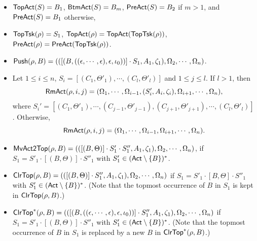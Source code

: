 \begin{itemize}
    \item $\mathsf{TopAct}(S) = B_1$, ${\sf BtmAct}(S) = B_m$, %
          $\mathsf{PreAct}(S) = B_2$ if $m> 1$, and $\mathsf{PreAct}(S) = B_1$ otherwise,
	\item $\mathsf{TopTsk}(\rho) = S_1$,  %
        $\mathsf{TopAct}(\rho) = \mathsf{TopAct}(\mathsf{TopTsk}(\rho))$, %
        $\mathsf{PreAct}(\rho) = \mathsf{PreAct}(\mathsf{TopTsk}(\rho))$.
	
    \item $\mathsf{Push}(\rho, B) = (([(B,((\epsilon,\cdots,\epsilon),\epsilon,\iota_0))] \cdot S_1,A_1,\zeta_1), \Omega_2, \cdots, \Omega_n)$.
%
	\item Let $1 \le i \le n$, $S_i = [(C_1, \Theta'_1), \cdots, (C_l, \Theta'_l)]$ and $1 \le j \le l$.  If $l>1$, then 
	$$\mathsf{RmAct}(\rho,i, j) = (\Omega_1,\cdots,\Omega_{i-1},(S_i', A_i, \zeta_i),\Omega_{i+1},\cdots,\Omega_n),$$ 
	where $S_i' =  [(C_1, \Theta'_1), \cdots, (C_{j-1}, \Theta'_{j-1}), (C_{j+1}, \Theta'_{j+1}), \cdots, (C_l, \Theta'_l)]$.
	Otherwise, 
	$$\mathsf{RmAct}(\rho,i, j) = (\Omega_1,\cdots,\Omega_{i-1},\Omega_{i+1},\cdots,\Omega_n).$$
	
	\item $\mathsf{MvAct2Top}(\rho, B)  =(([(B,\Theta)]\cdot S'_1 \cdot S''_1,A_1,\zeta_1), \Omega_2, \cdots, \Omega_n) $, 
        if $S_1=S'_1 \cdot[(B,\Theta)]\cdot S''_1$ with $S'_1 \in ({\sf Act} \setminus \{B\})^*$.
	\item $\mathsf{ClrTop}(\rho, B) = (([(B, \Theta)]\cdot S_1'',A_1,\zeta_1),\Omega_2,\cdots, \Omega_n)$ 
	if $S_1=S'_1 \cdot[B, \Theta]\cdot S''_1$ with $S'_1 \in ({\sf Act} \setminus \{B\})^*$. (Note that the topmost occurrence of $B$ in $S_1$ is kept in $\mathsf{ClrTop}(\rho, B)$.)
	\item $\mathsf{ClrTop}^*(\rho, B) = (([(B,((\epsilon,\cdots,\epsilon),\epsilon,\iota_0))]\cdot S_1'',A_1,\zeta_1),\Omega_2,\cdots, \Omega_n)$ 
	if $S_1=S'_1 \cdot[(B, \Theta)]\cdot S''_1$ with $S'_1 \in ({\sf Act} \setminus \{B\})^*$. (Note that the topmost occurrence of $B$ in $S_1$ is replaced by a new $B$ in $\mathsf{ClrTop}^*(\rho, B)$.)
	

\end{itemize}
